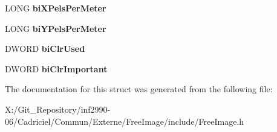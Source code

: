 \begin{DoxyCompactItemize}
\item 
\hypertarget{structtag_b_i_t_m_a_p_i_n_f_o_h_e_a_d_e_r_ae363738b6e92248a7be41f4e7ed55c54}{L\-O\-N\-G {\bfseries bi\-X\-Pels\-Per\-Meter}}\label{structtag_b_i_t_m_a_p_i_n_f_o_h_e_a_d_e_r_ae363738b6e92248a7be41f4e7ed55c54}

\item 
\hypertarget{structtag_b_i_t_m_a_p_i_n_f_o_h_e_a_d_e_r_ac6226594275d045ff0d03849945d920f}{L\-O\-N\-G {\bfseries bi\-Y\-Pels\-Per\-Meter}}\label{structtag_b_i_t_m_a_p_i_n_f_o_h_e_a_d_e_r_ac6226594275d045ff0d03849945d920f}

\item 
\hypertarget{structtag_b_i_t_m_a_p_i_n_f_o_h_e_a_d_e_r_adbf6bd52839895672030a734d2ae752f}{D\-W\-O\-R\-D {\bfseries bi\-Clr\-Used}}\label{structtag_b_i_t_m_a_p_i_n_f_o_h_e_a_d_e_r_adbf6bd52839895672030a734d2ae752f}

\item 
\hypertarget{structtag_b_i_t_m_a_p_i_n_f_o_h_e_a_d_e_r_a637282b108fc8ac3bdf41479f9931ccb}{D\-W\-O\-R\-D {\bfseries bi\-Clr\-Important}}\label{structtag_b_i_t_m_a_p_i_n_f_o_h_e_a_d_e_r_a637282b108fc8ac3bdf41479f9931ccb}

\end{DoxyCompactItemize}


The documentation for this struct was generated from the following file\-:\begin{DoxyCompactItemize}
\item 
X\-:/\-Git\-\_\-\-Repository/inf2990-\/06/\-Cadriciel/\-Commun/\-Externe/\-Free\-Image/include/Free\-Image.\-h\end{DoxyCompactItemize}
